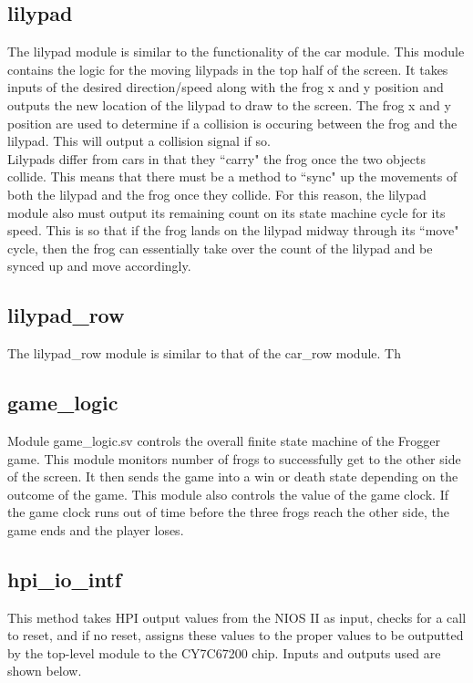 \documentclass[journal, twocolumn, final,11pt,letterpaper]{IEEEtran}
\begin{document}
	
	\subsection{lilypad}
	The lilypad module is similar to the functionality of the car module. This module contains the logic for the moving lilypads in the top half of the screen. It takes inputs of the desired direction/speed along with the frog x and y position and outputs the new location of the lilypad to draw to the screen. The frog x and y position are used to determine if a collision is occuring between the frog and the lilypad. This will output a collision signal if so. \\
	
	Lilypads differ from cars in that they ``carry" the frog once the two objects collide. This means that there must be a method to ``sync" up the movements of both the lilypad and the frog once they collide. For this reason, the lilypad module also must output its remaining count on its state machine cycle for its speed. This is so that if the frog lands on the lilypad midway through its ``move" cycle, then the frog can essentially take over the count of the lilypad and be synced up and move accordingly.
	
	\subsection{lilypad\_row}
	The lilypad\_row module is similar to that of the car\_row module. Th
	\subsection{game\_logic}
	Module game\_logic.sv controls the overall finite state machine of the Frogger game.  This module monitors number of frogs to successfully get to the other side of the screen.  It then sends the game into a win or death state depending on the outcome of the game.  This module also controls the value of the game clock.  If the game clock runs out of time before the three frogs reach the other side, the game ends and the player loses. 
	\subsection{hpi\_io\_intf}
	This method takes HPI output values from the NIOS II as input, checks for a call to reset, and if no reset, assigns these values to the proper values to be outputted by the top-level module to the CY7C67200 chip.  Inputs and outputs used are shown below. 
	
\end{document}
